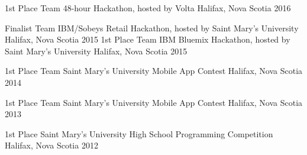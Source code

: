 



\begin{cvhonors}
  \cvhonor
    {1st Place Team} %
    {48-hour Hackathon, hosted by Volta} %
    {Halifax, Nova Scotia} %
    {2016} %

  \cvhonor
    {Finalist Team} %
    {IBM/Sobeys Retail Hackathon, hosted by Saint Mary's University} %
    {Halifax, Nova Scotia} %
    {2015} %
  \cvhonor
    {1st Place Team} %
    {IBM Bluemix Hackathon, hosted by Saint Mary's University} %
    {Halifax, Nova Scotia} %
    {2015} %

  \cvhonor
    {1st Place Team} %
    {Saint Mary's University Mobile App Contest} %
    {Halifax, Nova Scotia} %
    {2014} %

  \cvhonor
    {1st Place Team} %
    {Saint Mary's University Mobile App Contest} %
    {Halifax, Nova Scotia} %
    {2013} %

  \cvhonor
    {1st Place} %
    {Saint Mary's University High School Programming Competition} %
    {Halifax, Nova Scotia} %
    {2012} %


\end{cvhonors}
